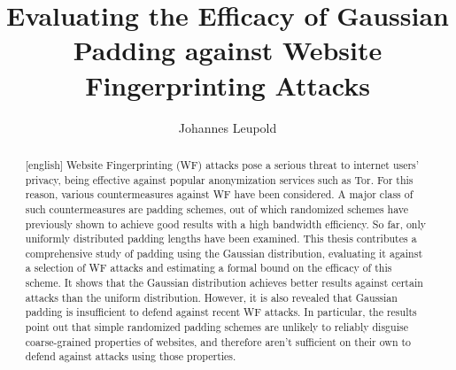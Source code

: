 \documentclass[
	ruledheaders=chapter,
	class=report,
	thesis={type=master, department=inf},
	accentcolor=1c,
	custommargins=true,
	marginpar=false,
	parskip=half-,
	fontsize=11pt,
]{tudapub}
\begin{document}
	
	\title{Evaluating the Efficacy of Gaussian Padding against Website Fingerprinting Attacks}
	\author[J. Leupold]{Johannes Leupold}

	
	
	
	\maketitle
	
	\affidavit[digital]

	\begin{abstract}[english]
		Website Fingerprinting (WF) attacks pose a serious threat to internet users' privacy, being effective against popular anonymization services such as Tor. For this reason, various countermeasures against WF have been considered. A major class of such countermeasures are padding schemes, out of which randomized schemes have previously shown to achieve good results with a high bandwidth efficiency. So far, only uniformly distributed padding lengths have been examined. This thesis contributes a comprehensive study of padding using the Gaussian distribution, evaluating it against a selection of WF attacks and estimating a formal bound on the efficacy of this scheme. It shows that the Gaussian distribution achieves better results against certain attacks than the uniform distribution. However, it is also revealed that Gaussian padding is insufficient to defend against recent WF attacks. In particular, the results point out that simple randomized padding schemes are unlikely to reliably disguise coarse-grained properties of websites, and therefore aren't sufficient on their own to defend against attacks using those properties.
	\end{abstract}
	
\end{document}
